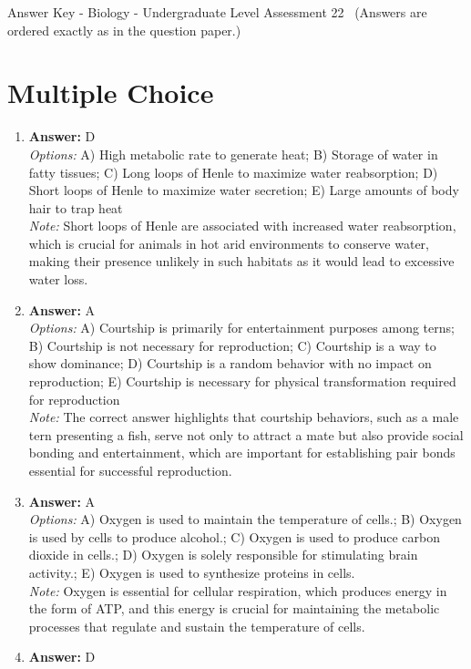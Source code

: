 \documentclass[12pt]{article}
\begin{document}
\begin{center}
Answer Key - Biology - Undergraduate Level Assessment 22 \
\small (Answers are ordered exactly as in the question paper.)
\end{center}

\section*{Multiple Choice}
\begin{enumerate}[label=\arabic*.]
\item \textbf{Answer:} D
\\ \textit{Options:} A) High metabolic rate to generate heat; B) Storage of water in fatty tissues; C) Long loops of Henle to maximize water reabsorption; D) Short loops of Henle to maximize water secretion; E) Large amounts of body hair to trap heat
\\ \textit{Note:} Short loops of Henle are associated with increased water reabsorption, which is crucial for animals in hot arid environments to conserve water, making their presence unlikely in such habitats as it would lead to excessive water loss.
\item \textbf{Answer:} A
\\ \textit{Options:} A) Courtship is primarily for entertainment purposes among terns; B) Courtship is not necessary for reproduction; C) Courtship is a way to show dominance; D) Courtship is a random behavior with no impact on reproduction; E) Courtship is necessary for physical transformation required for reproduction
\\ \textit{Note:} The correct answer highlights that courtship behaviors, such as a male tern presenting a fish, serve not only to attract a mate but also provide social bonding and entertainment, which are important for establishing pair bonds essential for successful reproduction.
\item \textbf{Answer:} A
\\ \textit{Options:} A) Oxygen is used to maintain the temperature of cells.; B) Oxygen is used by cells to produce alcohol.; C) Oxygen is used to produce carbon dioxide in cells.; D) Oxygen is solely responsible for stimulating brain activity.; E) Oxygen is used to synthesize proteins in cells.
\\ \textit{Note:} Oxygen is essential for cellular respiration, which produces energy in the form of ATP, and this energy is crucial for maintaining the metabolic processes that regulate and sustain the temperature of cells.
\item \textbf{Answer:} D

\end{enumerate}
\end{document}
